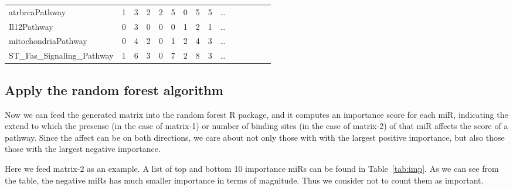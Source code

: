 \documentclass{scrartcl}
\numberwithin{figure}{section}
\numberwithin{table}{section}
\begin{document}
\begin{table}[h!]
\begin{tabular}{lllllllllllllll}
atrbrcaPathway                                   & 1            & 3           & 2               & 2          & 5            & 0            & 5            & 5 & \dots \\
Il12Pathway                                      & 0            & 3           & 0               & 0          & 0            & 1            & 2            & 1 & \dots \\
mitochondriaPathway                              & 0            & 4           & 2               & 0          & 1            & 2            & 4            & 3 & \dots \\
ST\_Fas\_Signaling\_Pathway                      & 1            & 6           & 3               & 0          & 7            & 2            & 8            & 3 & \dots \\
\bottomrule
\end{tabular}
\end{table}

\clearpage

\subsection{Apply the random forest algorithm}

Now we can feed the generated matrix into the random forest R package, and it
computes an importance score for each miR, indicating the extend to which the
presense (in the case of matrix-1) or number of binding sites (in the case of
matrix-2) of that miR affects the score of a pathway. Since the affect can be 
on both directions, we care about not only those with with the largest positive
importance, but also those those with the largest negative importance.

Here we feed matrix-2 as an example. A list of top and bottom 10 importance
miRs can be found in Table~\ref{tab:imp}. As we can see from the table, the
negative miRs has much smaller importance in terms of magnitude. Thus we
consider not to count them as important.
\end{document}
